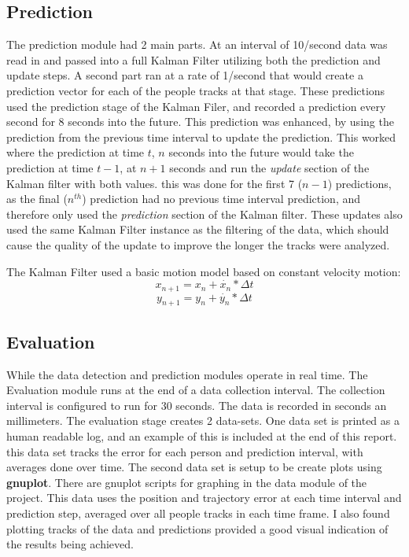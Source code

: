 \documentclass[10pt,a4paper]{article}
\begin{document}
\subsection{Prediction}
The prediction module had 2 main parts. At an interval of 10/second data was read in and passed into a full Kalman Filter utilizing both the prediction and update steps. A second part ran at a rate of 1/second that would create a prediction vector for each of the people tracks at that stage. These predictions used the prediction stage of the Kalman Filer, and recorded a prediction every second for 8 seconds into the future. This prediction was enhanced, by using the prediction from the previous time interval to update the prediction. This worked where the prediction at time $t$, $n$ seconds into the future would take the prediction at time $t-1$, at $n+1$ seconds and run the \textit{update} section of the Kalman filter with both values. this was done for the first 7 ($n-1$) predictions, as the final ($n^{th}$) prediction had no previous time interval prediction, and therefore only used the \textit{prediction} section of the Kalman filter. These updates also used the same Kalman Filter instance as the filtering of the data, which should cause the quality of the update to improve the longer the tracks were analyzed. 

The Kalman Filter used a basic motion model based on constant velocity motion:
\begin{equation}
x_{n+1} = x_n + \dot{x_n}*\Delta t
\end{equation}
\begin{equation}
y_{n+1} = y_n + \dot{y_n}*\Delta t
\end{equation}

\subsection{Evaluation}
While the data detection and prediction modules operate in real time. The Evaluation module runs at the end of a data collection interval. The collection interval is configured to run for 30 seconds. The data is recorded in seconds an millimeters. The evaluation stage creates 2 data-sets. One data set is printed as a human readable log, and an example of this is included at the end of this report. this data set tracks the error for each person and prediction interval, with averages done over time. The second data set is setup to be create plots using \textbf{gnuplot}. There are gnuplot scripts for graphing in the data module of the project. This data uses the position and trajectory error at each time interval and prediction step, averaged over all people tracks in each time frame. I also found plotting tracks of the data and predictions provided a good visual indication of the results being achieved.
\end{document}
